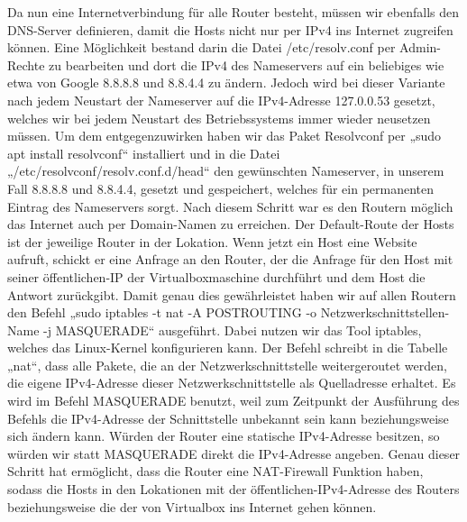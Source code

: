\documentclass[fontsize=12pt,paper=a4,open=any,parskip=half,
  twoside=false,toc=listof,toc=bibliography,fleqn,leqno,
  captions=nooneline,captions=tableabove,british]{scrbook}
\begin{document}
Da nun eine Internetverbindung für alle Router besteht, müssen wir ebenfalls den DNS-Server definieren, damit die Hosts nicht nur per IPv4 ins Internet zugreifen können. Eine Möglichkeit bestand darin die Datei /etc/resolv.conf per Admin-Rechte zu bearbeiten und dort die IPv4 des Nameservers auf ein beliebiges wie etwa von Google 8.8.8.8 und 8.8.4.4 zu ändern. Jedoch wird bei dieser Variante nach jedem Neustart der Nameserver auf die IPv4-Adresse 127.0.0.53 gesetzt, welches wir bei jedem Neustart des Betriebssystems immer wieder neusetzen müssen. Um dem entgegenzuwirken haben wir das Paket Resolvconf per „sudo apt install resolvconf“ installiert und in die Datei „/etc/resolvconf/resolv.conf.d/head“ den gewünschten Nameserver, in unserem Fall 8.8.8.8 und 8.8.4.4, gesetzt und gespeichert, welches für ein permanenten Eintrag des Nameservers sorgt. Nach diesem Schritt war es den Routern möglich das Internet auch per Domain-Namen zu erreichen. 
Der Default-Route der Hosts ist der jeweilige Router in der Lokation. Wenn jetzt ein Host eine Website aufruft, schickt er eine Anfrage an den Router, der die Anfrage für den Host mit seiner öffentlichen-IP der Virtualboxmaschine durchführt und dem Host die Antwort zurückgibt. Damit genau dies gewährleistet haben wir auf allen Routern den Befehl „sudo iptables -t nat -A POSTROUTING -o Netzwerkschnittstellen-Name -j MASQUERADE“ ausgeführt. Dabei nutzen wir das Tool iptables, welches das Linux-Kernel konfigurieren kann. Der Befehl schreibt in die Tabelle „nat“, dass alle Pakete, die an der Netzwerkschnittstelle weitergeroutet werden, die eigene IPv4-Adresse dieser Netzwerkschnittstelle als Quelladresse erhaltet. Es wird im Befehl MASQUERADE benutzt, weil zum Zeitpunkt der Ausführung des Befehls die IPv4-Adresse der Schnittstelle unbekannt sein kann beziehungsweise sich ändern kann. Würden der Router eine statische IPv4-Adresse besitzen, so würden wir statt MASQUERADE direkt die IPv4-Adresse angeben. Genau dieser Schritt hat ermöglicht, dass die Router eine NAT-Firewall Funktion haben, sodass die Hosts in den Lokationen mit der öffentlichen-IPv4-Adresse des Routers beziehungsweise die der von Virtualbox ins Internet gehen können.
\end{document}
